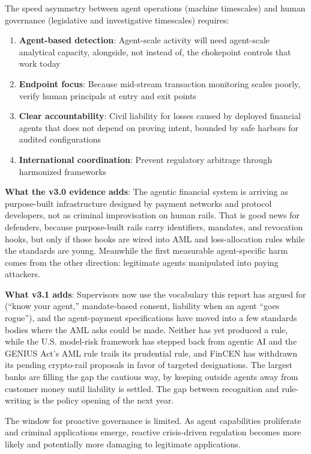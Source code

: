 \documentclass[11pt,letterpaper]{article}
\begin{document}
\begin{keybox}
The speed asymmetry between agent operations (machine timescales) and human governance (legislative and investigative timescales) requires:

\begin{enumerate}
  \item \textbf{Agent-based detection}: Agent-scale activity will need agent-scale analytical capacity, alongside, not instead of, the chokepoint controls that work today
  \item \textbf{Endpoint focus}: Because mid-stream transaction monitoring scales poorly, verify human principals at entry and exit points
  \item \textbf{Clear accountability}: Civil liability for losses caused by deployed financial agents that does not depend on proving intent, bounded by safe harbors for audited configurations
  \item \textbf{International coordination}: Prevent regulatory arbitrage through harmonized frameworks
\end{enumerate}

\textbf{What the v3.0 evidence adds}: The agentic financial system is arriving as purpose-built infrastructure designed by payment networks and protocol developers, not as criminal improvisation on human rails. That is good news for defenders, because purpose-built rails carry identifiers, mandates, and revocation hooks, but only if those hooks are wired into AML and loss-allocation rules while the standards are young. Meanwhile the first measurable agent-specific harm comes from the other direction: legitimate agents manipulated into paying attackers.

\textbf{What v3.1 adds}: Supervisors now use the vocabulary this report has argued for (``know your agent,'' mandate-based consent, liability when an agent ``goes rogue''), and the agent-payment specifications have moved into a few standards bodies where the AML asks could be made. Neither has yet produced a rule, while the U.S. model-risk framework has stepped back from agentic AI and the GENIUS Act's AML rule trails its prudential rule, and FinCEN has withdrawn its pending crypto-rail proposals in favor of targeted designations. The largest banks are filling the gap the cautious way, by keeping outside agents away from customer money until liability is settled. The gap between recognition and rule-writing is the policy opening of the next year.

The window for proactive governance is limited. As agent capabilities proliferate and criminal applications emerge, reactive crisis-driven regulation becomes more likely and potentially more damaging to legitimate applications.
\end{keybox}
\end{document}
